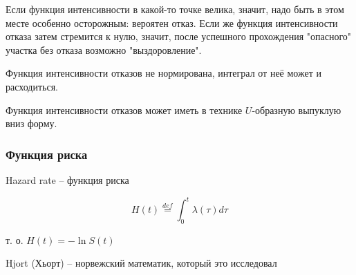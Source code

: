 \documentclass[main.tex]{sufbfiles}
\begin{document}
Если функция интенсивности в какой-то точке велика, значит, надо быть в этом месте особенно осторожным: вероятен отказ.
Если же функция интенсивности отказа затем стремится к нулю, значит, после успешного прохождения "опасного" участка без отказа возможно "выздоровление".

Функция интенсивности отказов не нормирована, интеграл от неё может и расходиться.

Функция интенсивности отказов может иметь в технике $ U $-образную выпуклую вниз форму.

\subsubsection{ Функция риска }

Hazard rate -- функция риска

\[ H(t) \overset{def}= \int_0^t \lambda(\tau) d \tau \]

т. о. $ H(t) = - \ln S(t) $

\begin{leftbar}
	Hjort (Хьорт) -- норвежский математик, который это исследовал
\end{leftbar}
\end{document}

